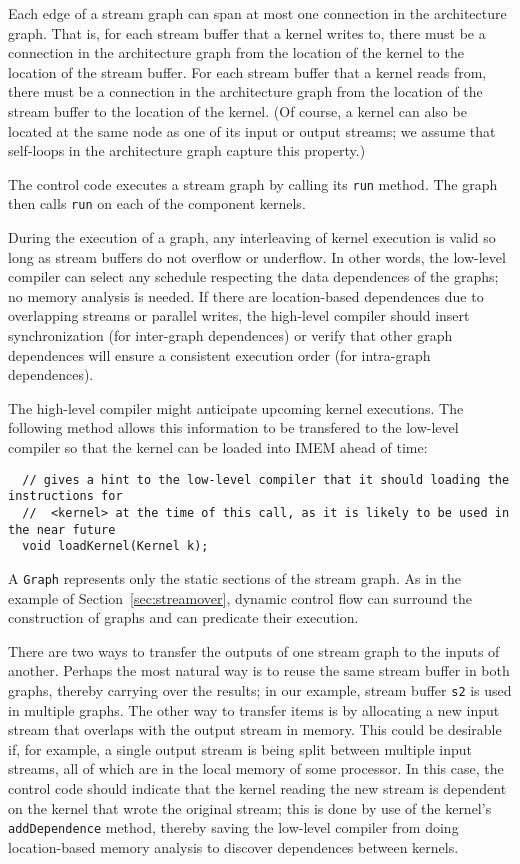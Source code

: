Each edge of a stream graph can span at most one connection in the
architecture graph.  That is, for each stream buffer that a kernel
writes to, there must be a connection in the architecture graph from
the location of the kernel to the location of the stream buffer.  For
each stream buffer that a kernel reads from, there must be a
connection in the architecture graph from the location of the stream
buffer to the location of the kernel.  (Of course, a kernel can also
be located at the same node as one of its input or output streams; we
assume that self-loops in the architecture graph capture this
property.)


The control code executes a stream graph by calling its {\tt run}
method.  The graph then calls {\tt run} on each of the component
kernels.  

During the execution of a graph, any interleaving of kernel execution
is valid so long as stream buffers do not overflow or underflow.  In
other words, the low-level compiler can select any schedule respecting
the data dependences of the graphs; no memory analysis is needed.  If
there are location-based dependences due to overlapping streams or
parallel writes, the high-level compiler should insert synchronization
(for inter-graph dependences) or verify that other graph dependences
will ensure a consistent execution order (for intra-graph
dependences).

The high-level compiler might anticipate upcoming kernel executions.
The following method allows this information to be transfered to the
low-level compiler so that the kernel can be loaded into IMEM ahead of
time:
\begin{verbatim}
  // gives a hint to the low-level compiler that it should loading the instructions for
  //  <kernel> at the time of this call, as it is likely to be used in the near future
  void loadKernel(Kernel k);
\end{verbatim}


A {\tt Graph} represents only the static sections of the stream graph.
As in the example of Section~\ref{sec:streamover}, dynamic control
flow can surround the construction of graphs and can predicate their
execution.

There are two ways to transfer the outputs of one stream graph to the
inputs of another.  Perhaps the most natural way is to reuse the same
stream buffer in both graphs, thereby carrying over the results; in
our example, stream buffer {\tt s2} is used in multiple graphs.  The
other way to transfer items is by allocating a new input stream that
overlaps with the output stream in memory.  This could be desirable
if, for example, a single output stream is being split between
multiple input streams, all of which are in the local memory of some
processor.  In this case, the control code should indicate that the
kernel reading the new stream is dependent on the kernel that wrote
the original stream; this is done by use of the kernel's {\tt
addDependence} method, thereby saving the low-level compiler from
doing location-based memory analysis to discover dependences between
kernels.

